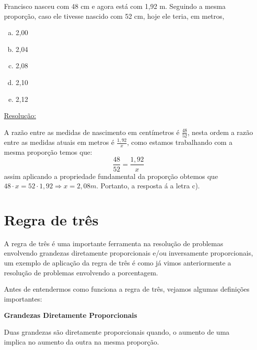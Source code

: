 \begin{exem}[VUNESP - 2012]
 Francisco nasceu com 48 cm e agora está com 1,92 m. Seguindo a mesma proporção, caso ele tivesse nascido com 52 cm, hoje ele teria, em metros,
 \begin{multicols}{5}
 \begin{enumerate}[a)]
  \item 2,00
  \item 2,04
  \item 2,08
  \item 2,10
  \item 2,12
 \end{enumerate}
 \end{multicols}

\underline{Resolução:}

A razão entre as medidas de nascimento em centímetros é $\frac{48}{52}$, nesta ordem a razão entre as medidas atuais em metros é $\frac{1,92}{x}$, como estamos trabalhando com a mesma proporção temos que:
\[\frac{48}{52} = \frac{1,92}{x}\]
assim aplicando a propriedade fundamental da proporção obtemos que $48 \cdot x= 52 \cdot 1,92 \Rightarrow x= 2,08 m$. Portanto, a resposta á a letra c).

\fim
\end{exem}


\chapter{Regra de três}

A regra de três é uma importante ferramenta na resolução de problemas envolvendo grandezas diretamente proporcionais e/ou inversamente proporcionais, um exemplo de aplicação da regra de três é como já vimos anteriormente a resolução de problemas envolvendo a porcentagem.

Antes de entendermos como funciona a regra de três, vejamos algumas definições importantes:

\vskip0.3cm

\colorbox{azul}{
 \begin{minipage}{0.9\linewidth}
 \begin{center}
 \textbf{Grandezas Diretamente Proporcionais}

   Duas grandezas são diretamente proporcionais quando, o aumento de uma implica no aumento da outra na mesma proporção.
 \end{center}
 \end{minipage}}

 \vskip0.3cm

